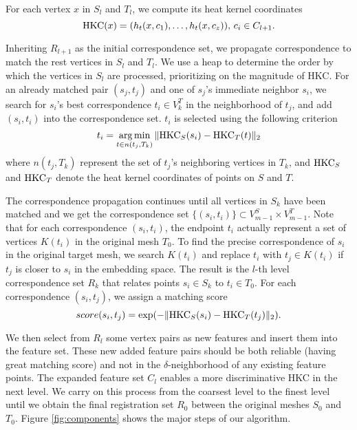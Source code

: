 For each vertex $x$ in $S_l$ and $T_l$, we compute its heat kernel coordinates
\begin{equation}
\operatorname*{HKC}(x)=(h_t(x,c_1),\dots,h_t(x,c_z)) \mbox{, } c_i\in C_{l+1}.
\end{equation}

Inheriting $R_{l+1}$ as the initial correspondence set, we propagate correspondence to match the rest vertices in $S_l$ and $T_l$. We use a heap to determine the order by which the vertices in $S_l$ are processed, prioritizing on the magnitude of HKC. For an already matched pair $(s_j, t_j)$ and one of $s_j$'s immediate neighbor $s_i$, we search for $s_i$'s best correspondence $t_i \in V^T_k$ in the neighborhood of $t_j$, and add $(s_i,t_i)$ into the correspondence set. $t_i$ is selected using the following criterion
\begin{equation}
t_i=\operatorname*{arg\,min}_{t\in n(t_j,T_k)}\|{\operatorname*{HKC}}_S(s_i)-{\operatorname*{HKC}}_T(t)\|_2
\end{equation}
where $n(t_j,T_k)$ represent the set of $t_j$'s neighboring vertices in $T_k$, and $\operatorname*{HKC}_S$ and $\operatorname*{HKC}_T$ denote the heat kernel coordinates of points on $S$ and $T$.

The correspondence propagation continues until all vertices in $S_k$ have been matched and we get the correspondence set $\{(s_i,t_i)\} \subset V^S_{m-1} \times V^T_{m-1}$. Note that for each correspondence $(s_i,t_i)$, the endpoint $t_i$ actually represent a set of vertices $K(t_i)$ in the original mesh $T_0$. To find the precise correspondence of $s_i$ in the original target mesh, we search $K(t_i)$ and replace $t_i$ with $t_j \in K(t_i)$ if $t_j$ is closer to $s_i$ in the embedding space. The result is the $l$-th level correspondence set $R_k$ that relates points $s_i \in S_k$ to $t_i \in T_0$. For each correspondence $(s_i,t_j)$, we assign a matching score
\begin{equation}
score(s_i,t_j)=\exp(-\|{\operatorname*{HKC}}_S(s_i)-{\operatorname*{HKC}}_T(t_j)\|_2).
\end{equation}

We then select from $R_l$ some vertex pairs as new features and insert them into the feature set. These new added feature pairs should be both reliable (having great matching score) and not in the $\delta$-neighborhood of any existing feature points. The expanded feature set $C_l$ enables a more discriminative HKC in the next level. We carry on this process from the coarsest level to the finest level until we obtain the final registration set $R_0$ between the original meshes $S_0$ and $T_0$. Figure \ref{fig:components} shows the major steps of our algorithm.

